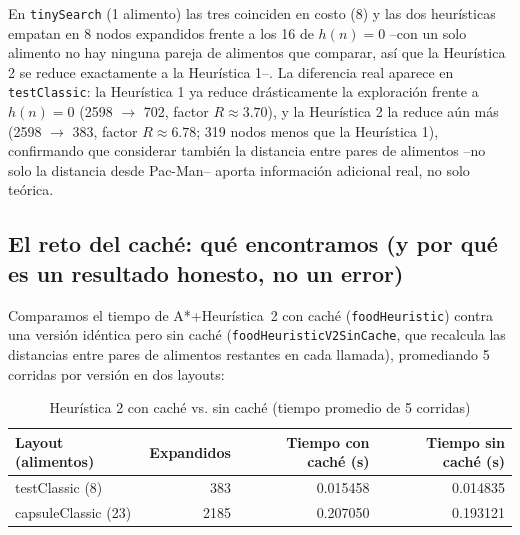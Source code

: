 En \texttt{tinySearch} (1 alimento) las tres coinciden en costo (8) y las dos heurísticas empatan
en 8 nodos expandidos frente a los 16 de $h(n)=0$ --con un solo alimento no hay ninguna pareja de
alimentos que comparar, así que la Heurística 2 se reduce exactamente a la Heurística 1--. La
diferencia real aparece en \texttt{testClassic}: la Heurística 1 ya reduce drásticamente la
exploración frente a $h(n)=0$ (2598 $\rightarrow$ 702, factor $R \approx 3.70$), y la Heurística 2
la reduce aún más (2598 $\rightarrow$ 383, factor $R \approx 6.78$; 319 nodos menos que la
Heurística 1), confirmando que considerar también la distancia entre pares de alimentos --no solo
la distancia desde Pac-Man-- aporta información adicional real, no solo teórica.

\subsection{El reto del caché: qué encontramos (y por qué es un resultado honesto, no un error)}

Comparamos el tiempo de A*+Heurística~2 con caché (\texttt{foodHeuristic}) contra una versión
idéntica pero sin caché (\texttt{foodHeuristicV2SinCache}, que recalcula las distancias entre pares
de alimentos restantes en cada llamada), promediando 5 corridas por versión en dos layouts:

\begin{table}[H]
\centering
\caption{Heurística 2 con caché vs. sin caché (tiempo promedio de 5 corridas)}
\label{tab:act11-cache}
\begin{tabular}{lrrr}
\toprule
\textbf{Layout (alimentos)} & \textbf{Expandidos} & \textbf{Tiempo con caché (s)} & \textbf{Tiempo sin caché (s)} \\
\midrule
testClassic (8)    & 383  & 0.015458 & 0.014835 \\
capsuleClassic (23) & 2185 & 0.207050 & 0.193121 \\
\bottomrule
\end{tabular}
\end{table}


